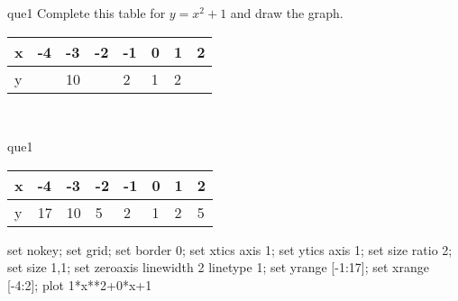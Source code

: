 \documentclass[13.5pt, varwidth=true]{beamer}
\begin{document}
\begin{frame}[shrink=19,fragile]
	\begin{beamercolorbox}[rounded=true, left, shadow=true,wd=14.8cm]{que1}
		 Complete this table for $y = x^{2} + 1$ and draw the graph. \\[0.3cm] \renewcommand{\arraystretch}{1.2}\begin{tabular}{|C|C|C|C|C|C|C|C|} \hline x & -4 & -3 & -2 & -1 & 0 & 1 & 2 \\ \hline y &  & 10 &  & 2 & 1 & 2 & \\ \hline \end{tabular}\\[0.3cm]
	\end{beamercolorbox}
\end{frame}
\begin{frame}[shrink=19,fragile]
	\begin{beamercolorbox}[rounded=true, left, shadow=true,wd=14.8cm]{que1}
		\renewcommand{\arraystretch}{1.2}\begin{tabular}{|C|C|C|C|C|C|C|C|} \hline x & -4 & -3 & -2 & -1 & 0 & 1 & 2 \\ \hline y & 17 & 10 & 5 & 2 & 1 & 2 & 5\\ \hline \end{tabular}\begin{gnuplot}[terminal=pdf] set nokey; set grid; set border 0; set xtics axis 1; set ytics axis 1; set size ratio 2; set size 1,1; set zeroaxis linewidth 2 linetype 1; set yrange [-1:17]; set xrange [-4:2]; plot 1*x**2+0*x+1 \end{gnuplot}
	\end{beamercolorbox}
\end{frame}
\end{document}
